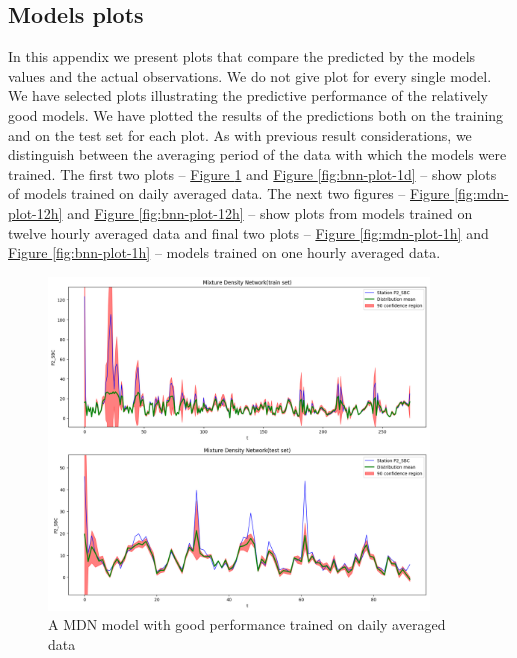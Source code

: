 \documentclass[12pt,a4paper,twoside]{scrartcl}
\numberwithin{equation}{section}
\newcommand{\reffig}[1]{\hyperref[#1]{Figure \ref*{#1}}}
\newcounter{mypagecount}%
\newenvironment{interlude}{%
  \clearpage
  \setcounter{mypagecount}{\value{page}}%
  \thispagestyle{empty}%
  \pagestyle{empty}%
}{%
  \clearpage
  \setcounter{page}{\value{mypagecount}}%
}
\let\chapter=\section %
\begin{document}
\begin{interlude}
\begin{appendices}
    \chapter{Models plots}\label{app:f}
    In this appendix we present plots that compare the predicted by the models values and the actual observations. We do not give plot for every single model. We have selected plots illustrating the predictive performance of the relatively good models. We have plotted the results of the predictions both on the training and on the test set for each plot. As with previous result considerations, we distinguish between the averaging period of the data with which the models were trained. The first two plots -- \reffig{fig:mdn-plot-1d} and \reffig{fig:bnn-plot-1d} -- show plots of models trained on daily averaged data. The next two figures -- \reffig{fig:mdn-plot-12h} and \reffig{fig:bnn-plot-12h} -- show plots from models trained on twelve hourly averaged data and final two plots -- \reffig{fig:mdn-plot-1h} and \reffig{fig:bnn-plot-1h} -- models trained on one hourly averaged data.
    \begin{center}
      \begin{figure}[h!]
        \centering
        \includegraphics[height=0.75\textwidth, width=0.9\textwidth]{figures/model_plots/mdn_1d}
        \caption[MDN one day plot]{A MDN model with good performance trained on daily averaged data}\label{fig:mdn-plot-1d}
      \end{figure}
    \end{center}
    \begin{center}
      \begin{figure}[h!]

\end{figure}
\end{center}
\end{appendices}
\end{interlude}
\end{document}
